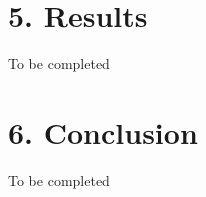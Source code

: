 \documentclass[11pt,]{article}
\begin{document}
\newpage

\section{5. Results}\label{results}

To be completed

\section{6. Conclusion}\label{conclusion}

To be completed




\newpage
\singlespacing 

\end{document}
